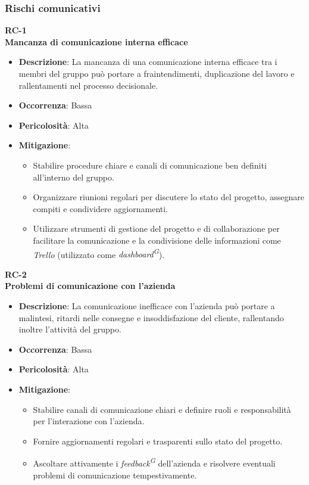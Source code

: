 \documentclass[5pt]{article}
\begin{document}
\subsubsection{Rischi comunicativi}
\textbf{RC-1}\\
\textbf{Mancanza di comunicazione interna efficace}
\begin{itemize}
  \item \textbf{Descrizione}: La mancanza di una comunicazione interna efficace tra i membri del gruppo può portare a fraintendimenti, duplicazione del lavoro e rallentamenti nel processo decisionale.
  \item \textbf{Occorrenza}: Bassa
  \item \textbf{Pericolosità}: Alta
  \item \textbf{Mitigazione}: 
    \begin{itemize}
      \item Stabilire procedure chiare e canali di comunicazione ben definiti all'interno del gruppo.
      \item Organizzare riunioni regolari per discutere lo stato del progetto, assegnare compiti e condividere aggiornamenti.
      \item Utilizzare strumenti di gestione del progetto e di collaborazione per facilitare la comunicazione e 
      la condivisione delle informazioni come \textit{Trello} (utilizzato come \textit{dashboard\textsuperscript{G}}).
    \end{itemize}
\end{itemize}
\textbf{RC-2}\\
\textbf{Problemi di comunicazione con l'azienda}
\begin{itemize}
  \item \textbf{Descrizione}: La comunicazione inefficace con l'azienda può portare a malintesi, ritardi nelle consegne e insoddisfazione del cliente, rallentando inoltre l'attività del gruppo.
  \item \textbf{Occorrenza}: Bassa
  \item \textbf{Pericolosità}: Alta
  \item \textbf{Mitigazione}: 
    \begin{itemize}
      \item Stabilire canali di comunicazione chiari e definire ruoli e responsabilità per l'interazione con l'azienda.
      \item Fornire aggiornamenti regolari e trasparenti sullo stato del progetto.
      \item Ascoltare attivamente i \textit{feedback\textsuperscript{G}} dell'azienda e risolvere eventuali problemi di comunicazione tempestivamente.
    \end{itemize}
\end{itemize}
\end{document}
